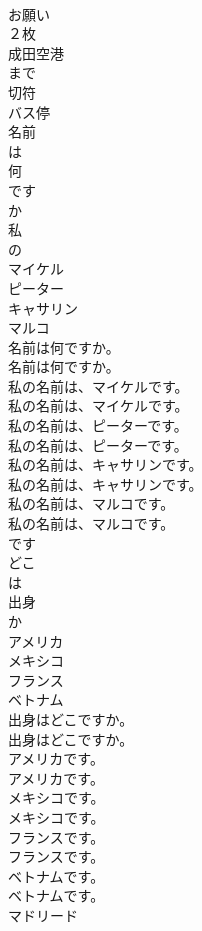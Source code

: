 \documentclass[8pt]{extreport}
\begin{document}
\begin{CJK}{UTF8}{min}
\\	お願い
\\	２枚
\\	成田空港
\\	まで
\\	切符
\\	バス停
\\	名前
\\	は
\\	何
\\	です
\\	か
\\	私
\\	の
\\	マイケル
\\	ピーター
\\	キャサリン
\\	マルコ
\\	名前は何ですか。	
\\	名前は何ですか。 
\\	私の名前は、マイケルです。	
\\	私の名前は、マイケルです。 
\\	私の名前は、ピーターです。	
\\	私の名前は、ピーターです。 
\\	私の名前は、キャサリンです。	
\\	私の名前は、キャサリンです。 
\\	私の名前は、マルコです。	
\\	私の名前は、マルコです。 
\\	です
\\	どこ
\\	は
\\	出身
\\	か
\\	アメリカ
\\	メキシコ
\\	フランス
\\	ベトナム
\\	出身はどこですか。	
\\	出身はどこですか。 
\\	アメリカです。	
\\	アメリカです。 
\\	メキシコです。	
\\	メキシコです。 
\\	フランスです。	
\\	フランスです。 
\\	ベトナムです。	
\\	ベトナムです。 
\\	マドリード

\end{CJK}
\end{document}
